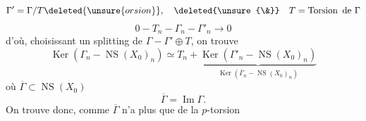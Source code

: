 \[
\Gamma'=\Gamma/T\deleted{\unsure{orsion}},\quad\deleted{\unsure{\&}}\quad T=\operatorname{Torsion}\text{ de }\Gamma
\]
\[
0\mathbin{-}T_n\mathbin{-}\Gamma_n\mathbin{-}\Gamma'_n\longrightarrow0
\]
d'où, choisissant un splitting de $\Gamma\mathbin{-}\Gamma'\oplus T$, on trouve
\[
\operatorname{Ker}(\Gamma_n\mathbin{-}\operatorname{NS}(X_0)_n)\simeq T_n+\underbrace{\operatorname{Ker}(\Gamma'_n\mathbin{-}\operatorname{NS}(X_0)_n)}_{\operatorname{Ker}(\overline\Gamma_n\mathbin{-}\operatorname{NS}(X_0)_n)}
\]
où $\overline\Gamma\subset\operatorname{NS}(X_0)$
\[
\overline\Gamma=\operatorname{Im}\Gamma.
\]
On trouve donc, comme $\overline\Gamma$ n'a plus que de la $p$-torsion
